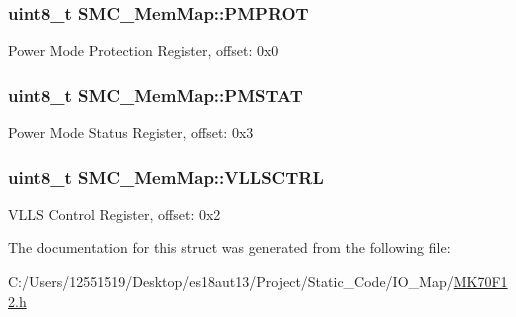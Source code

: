 \subsubsection[{P\+M\+P\+R\+O\+T}]{\setlength{\rightskip}{0pt plus 5cm}uint8\+\_\+t S\+M\+C\+\_\+\+Mem\+Map\+::\+P\+M\+P\+R\+O\+T}\label{struct_s_m_c___mem_map_afd03d93a7823dc65f53216dca15a2a95}
Power Mode Protection Register, offset\+: 0x0 \hypertarget{struct_s_m_c___mem_map_a0fddef87e229c4cf1b3be0d29589e964}{}
\subsubsection[{P\+M\+S\+T\+A\+T}]{\setlength{\rightskip}{0pt plus 5cm}uint8\+\_\+t S\+M\+C\+\_\+\+Mem\+Map\+::\+P\+M\+S\+T\+A\+T}\label{struct_s_m_c___mem_map_a0fddef87e229c4cf1b3be0d29589e964}
Power Mode Status Register, offset\+: 0x3 \hypertarget{struct_s_m_c___mem_map_ad5b37041739800b7bb7afc59d53c7ded}{}
\subsubsection[{V\+L\+L\+S\+C\+T\+R\+L}]{\setlength{\rightskip}{0pt plus 5cm}uint8\+\_\+t S\+M\+C\+\_\+\+Mem\+Map\+::\+V\+L\+L\+S\+C\+T\+R\+L}\label{struct_s_m_c___mem_map_ad5b37041739800b7bb7afc59d53c7ded}
V\+L\+L\+S Control Register, offset\+: 0x2 

The documentation for this struct was generated from the following file\+:\begin{DoxyCompactItemize}
\item 
C\+:/\+Users/12551519/\+Desktop/es18aut13/\+Project/\+Static\+\_\+\+Code/\+I\+O\+\_\+\+Map/\hyperlink{_m_k70_f12_8h}{M\+K70\+F12.\+h}\end{DoxyCompactItemize}
